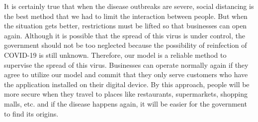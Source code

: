     \par It is certainly true that when the disease outbreaks are severe, social distancing is the best method that we had to limit the interaction between people. But when the situation gets better, restrictions must be lifted so that businesses can open again. Although it is possible that the spread of this virus is under control, the government should not be too neglected because the possibility of reinfection of COVID-19 is still unknown. Therefore, our model is a reliable method to supervise the spread of this virus. Businesses can operate normally again if they agree to utilize our model and commit that they only serve customers who have the application installed on their digital device. By this approach, people will be more secure when they travel to places like restaurants, supermarkets, shopping malls, etc. and if the disease happens again, it will be easier for the government to find its origins.

